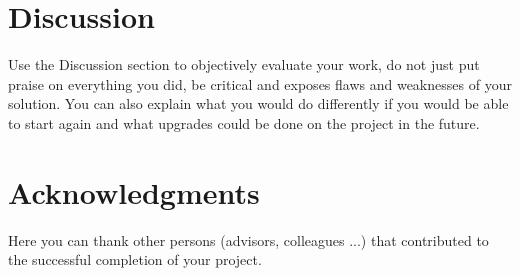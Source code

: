 \documentclass[fleqn,moreauthors,10pt]{ds_report}
\begin{document}
		
		
		\section*{Discussion}
		
		Use the Discussion section to objectively evaluate your work, do not just put praise on everything you did, be critical and exposes flaws and weaknesses of your solution. You can also explain what you would do differently if you would be able to start again and what upgrades could be done on the project in the future.
		
		
		
		\section*{Acknowledgments}
		
		Here you can thank other persons (advisors, colleagues ...) that contributed to the successful completion of your project.
		
		
		
		
		
		
	
\end{document}
